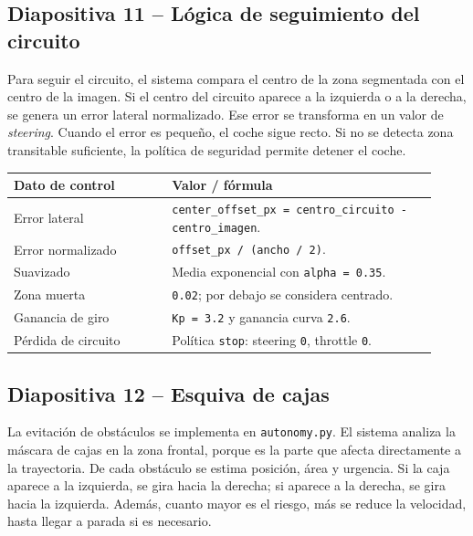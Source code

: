 \documentclass[a4paper,11pt]{article}
\begin{document}
\subsection*{Diapositiva 11 -- L\'ogica de seguimiento del circuito}
Para seguir el circuito, el sistema compara el centro de la zona segmentada con el centro de la imagen. Si el centro del circuito aparece a la izquierda o a la derecha, se genera un error lateral normalizado. Ese error se transforma en un valor de \textit{steering}. Cuando el error es peque\~no, el coche sigue recto. Si no se detecta zona transitable suficiente, la pol\'itica de seguridad permite detener el coche.

\begin{center}
\centering
\footnotesize
\begin{tabular}{@{}L{0.34\linewidth}L{0.58\linewidth}@{}}
\toprule
\textbf{Dato de control} & \textbf{Valor / f\'ormula} \\
\midrule
Error lateral & \texttt{center\_offset\_px = centro\_circuito - centro\_imagen}. \\
Error normalizado & \texttt{offset\_px / (ancho / 2)}. \\
Suavizado & Media exponencial con \texttt{alpha = 0.35}. \\
Zona muerta & \texttt{0.02}; por debajo se considera centrado. \\
Ganancia de giro & \texttt{Kp = 3.2} y ganancia curva \texttt{2.6}. \\
P\'erdida de circuito & Pol\'itica \texttt{stop}: steering \texttt{0}, throttle \texttt{0}. \\
\bottomrule
\end{tabular}
\end{center}

\subsection*{Diapositiva 12 -- Esquiva de cajas}
La evitaci\'on de obst\'aculos se implementa en \texttt{autonomy.py}. El sistema analiza la m\'ascara de cajas en la zona frontal, porque es la parte que afecta directamente a la trayectoria. De cada obst\'aculo se estima posici\'on, \'area y urgencia. Si la caja aparece a la izquierda, se gira hacia la derecha; si aparece a la derecha, se gira hacia la izquierda. Adem\'as, cuanto mayor es el riesgo, m\'as se reduce la velocidad, hasta llegar a parada si es necesario.
\end{document}
